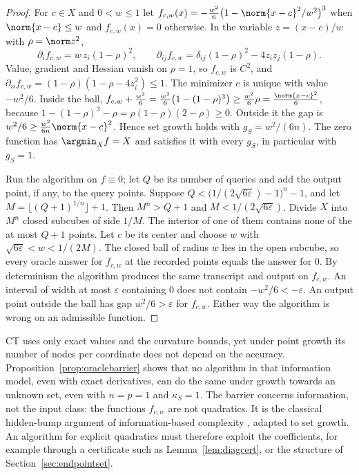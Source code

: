 \begin{proof}
For $c\in X$ and $0<w\le1$ let
$f_{c,w}(x)=-\frac{w^2}6\bigl(1-\norm{x-c}^2/w^2\bigr)^3$ when
$\norm{x-c}\le w$ and $f_{c,w}(x)=0$ otherwise. In the variable $z=(x-c)/w$
with $\rho=\norm z^2$,
\[
\partial_if_{c,w}=w\,z_i(1-\rho)^2,\qquad
\partial_{ij}f_{c,w}=\delta_{ij}(1-\rho)^2-4z_iz_j(1-\rho).
\]
Value, gradient and Hessian vanish on $\rho=1$, so $f_{c,w}$ is $C^2$, and
$\partial_{ii}f_{c,w}=(1-\rho)(1-\rho-4z_i^2)\le1$. The minimizer $c$ is
unique with value $-w^2/6$. Inside the ball,
$f_{c,w}+\frac{w^2}6=\frac{w^2}6\bigl(1-(1-\rho)^3\bigr)\ge\frac{w^2}6\rho
=\frac{\norm{x-c}^2}6$, because $1-(1-\rho)^3-\rho=\rho(1-\rho)(2-\rho)\ge0$.
Outside it the gap is $w^2/6\ge\frac{w^2}{6n}\norm{x-c}^2$. Hence set growth
holds with $g_S=w^2/(6n)$. The zero function has $\argmin_Xf=X$ and satisfies
it with every $g_S$, in particular with $g_S=1$.

Run the algorithm on $f\equiv0$; let $Q$ be its number of queries and add
the output point, if any, to the query points. Suppose
$Q<\bigl(1/(2\sqrt{6\varepsilon})-1\bigr)^n-1$, and let
$M=\lfloor(Q+1)^{1/n}\rfloor+1$. Then $M^n>Q+1$ and $M<1/(2\sqrt{6\varepsilon})$.
Divide $X$ into $M^n$ closed subcubes of side $1/M$. The interior of one of
them contains none of the at most $Q+1$ points. Let $c$ be its center and
choose $w$ with $\sqrt{6\varepsilon}<w<1/(2M)$. The closed ball of radius $w$
lies in the open subcube, so every oracle answer for $f_{c,w}$ at the
recorded points equals the answer for $0$. By determinism the algorithm
produces the same transcript and output on $f_{c,w}$. An interval of width at
most $\varepsilon$ containing $0$ does not contain $-w^2/6<-\varepsilon$. An
output point outside the ball has gap $w^2/6>\varepsilon$ for $f_{c,w}$.
Either way the algorithm is wrong on an admissible function.
\end{proof}

CT uses only exact values and the curvature bounds, yet under point growth
its number of nodes per coordinate does not depend on the accuracy.
Proposition~\ref{prop:oraclebarrier} shows that no algorithm in that
information model, even with exact derivatives, can do the same under growth
towards an unknown set, even with $n=p=1$ and $\kappa_S=1$. The barrier
concerns information, not the input class: the functions $f_{c,w}$ are not
quadratics. It is the classical hidden-bump argument of information-based
complexity \cite{NemirovskiYudin1983}, adapted to set growth. An algorithm
for explicit quadratics must therefore exploit the coefficients, for example
through a certificate such as Lemma~\ref{lem:diagcert}, or the structure of
Section~\ref{sec:endpointset}.

